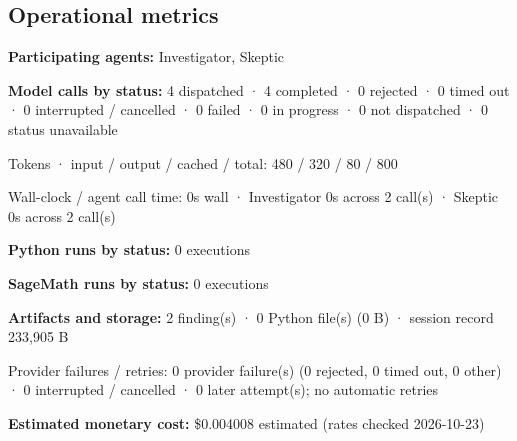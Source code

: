 \documentclass[11pt]{article}
\begin{document}
\subsection{Operational metrics}
\textbf{Participating agents:} Investigator, Skeptic\par
\textbf{Model calls by status:} 4 dispatched · 4 completed · 0 rejected · 0 timed out · 0 interrupted / cancelled · 0 failed · 0 in progress · 0 not dispatched · 0 status unavailable\par
Tokens · input / output / cached / total: 480 / 320 / 80 / 800\par
Wall-clock / agent call time: 0s wall · Investigator 0s across 2 call(s) · Skeptic 0s across 2 call(s)\par
\textbf{Python runs by status:} 0 executions\par
\textbf{SageMath runs by status:} 0 executions\par
\textbf{Artifacts and storage:} 2 finding(s) · 0 Python file(s) (0 B) · session record 233,905 B\par
Provider failures / retries: 0 provider failure(s) (0 rejected, 0 timed out, 0 other) · 0 interrupted / cancelled · 0 later attempt(s); no automatic retries\par
\textbf{Estimated monetary cost:} \$0.004008 estimated (rates checked 2026-10-23)\par
\end{document}
